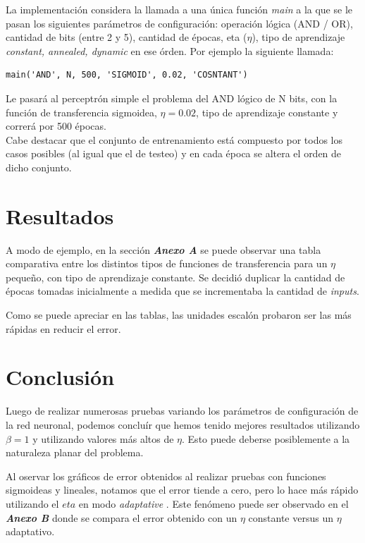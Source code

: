 \documentclass[%
    final,
    reprint,
    notitlepage,
    narroweqnarray,
    inline,
    twoside,
    invited
    ]{ieee}
\begin{document}
\par La implementación considera la llamada a una única función \textit{main} a la que se le pasan los siguientes parámetros de configuración: operación lógica (AND / OR), cantidad de bits (entre 2 y 5), cantidad de épocas, eta ($\eta$), tipo de aprendizaje \textit{constant, annealed, dynamic} en ese órden.
Por ejemplo la siguiente llamada:

\begin{verbatim}
main('AND', N, 500, 'SIGMOID', 0.02, 'COSNTANT')
\end{verbatim}

Le pasará al perceptrón simple el problema del AND lógico de N bits, con la función de transferencia sigmoidea, $\eta=0.02$, tipo de aprendizaje constante y correrá por 500 épocas.\\
Cabe destacar que el conjunto de entrenamiento está compuesto por todos los casos posibles (al igual que el de testeo) y en cada época se altera el orden de 
dicho conjunto.

\section{Resultados}

\par A modo de ejemplo, en la sección \textit{\textbf{Anexo A}} se puede observar una tabla comparativa entre los distintos tipos de funciones 
de transferencia para un $\eta$ pequeño, con tipo de aprendizaje constante. Se decidió duplicar la cantidad de épocas tomadas inicialmente a
 medida que se incrementaba la cantidad de \textit{inputs}.

\par Como se puede apreciar en las tablas, las unidades escalón probaron ser las más rápidas en reducir el error.

\section{Conclusión}

\PARstart Luego de realizar numerosas pruebas variando los parámetros de configuración de la red neuronal, 
podemos concluír que hemos tenido mejores resultados utilizando $\beta=1$ y utilizando valores más altos de $\eta$. 
Esto puede deberse posiblemente a la naturaleza planar del problema.

\par Al oservar los gráficos de error obtenidos al realizar pruebas con funciones sigmoideas y lineales, 
notamos que el error tiende a cero, pero lo hace más rápido utilizando el $eta$ en modo \textit{adaptative}
. Este fenómeno puede ser observado en el \textit{\textbf{Anexo B}} donde se compara 
el error obtenido con un $\eta$ constante versus un $\eta$ adaptativo.
\end{document}
